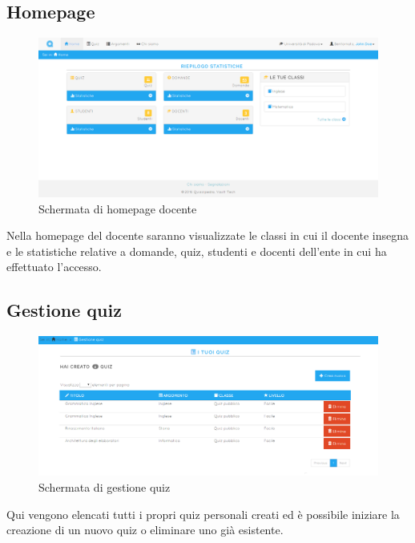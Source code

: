 \documentclass[a4paper, titlepage]{article}
\begin{document}
	 \subsection{Homepage}
	 \begin{figure}[!h]
	 	\centering
	 	\includegraphics[scale=0.33]{Img/screen_HomepageDocente.png}
	 	\caption{Schermata di homepage docente}
	 \end{figure}
	 Nella homepage del docente saranno visualizzate le classi in cui il docente insegna e le statistiche relative a domande, quiz, studenti e docenti dell'ente in cui ha effettuato l'accesso.
	 
	 
	 \subsection{Gestione quiz}
	 \begin{figure}[!h]
	 	\centering
	 	\includegraphics[scale=0.33]{Img/screen_GestioneQuiz.png}
	 	\caption{Schermata di gestione quiz}
	 \end{figure}
	 Qui vengono elencati tutti i propri quiz personali creati ed è possibile iniziare la creazione di un nuovo quiz o eliminare uno già esistente.
	 
\end{document}
